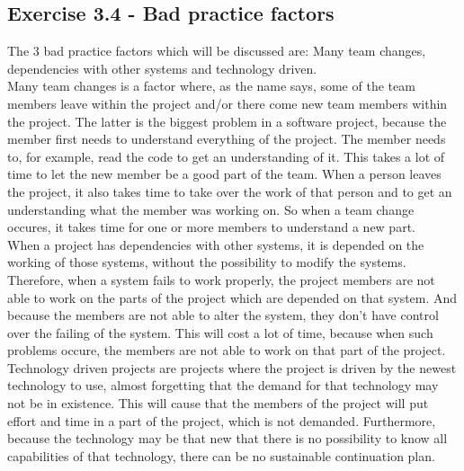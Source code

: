 \subsection{Exercise 3.4 - Bad practice factors}
The 3 bad practice factors which will be discussed are: Many team changes, dependencies with other systems and technology driven.\\
Many team changes is a factor where, as the name says, some of the team members leave within the project and/or there come new team members within the project. The latter is the biggest problem in a software project, because the member first needs to understand everything of the project. The member needs to, for example, read the code to get an understanding of it. This takes a lot of time to let the new member be a good part of the team. When a person leaves the project, it also takes time to take over the work of that person and to get an understanding what the member was working on. So when a team change occures, it takes time for one or more members to understand a new part.\\
When a project has dependencies with other systems, it is depended on the working of those systems, without the possibility to modify the systems. Therefore, when a system fails to work properly, the project members are not able to work on the parts of the project which are depended on that system. And because the members are not able to alter the system, they don't have control over the failing of the system. This will cost a lot of time, because when such problems occure, the members are not able to work on that part of the project.\\
Technology driven projects are projects where the project is driven by the newest technology to use, almost forgetting that the demand for that technology may not be in existence. This will cause that the members of the project will put effort and time in a part of the project, which is not demanded. Furthermore, because the technology may be that new that there is no possibility to know all capabilities of that technology, there can be no sustainable continuation plan. 

